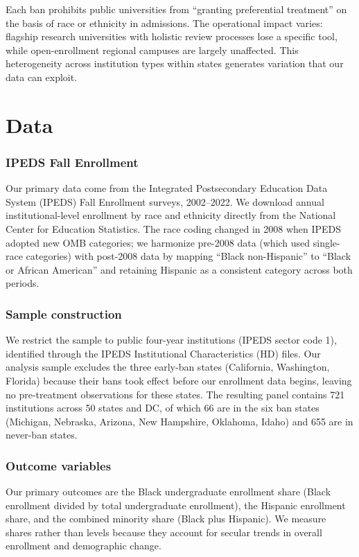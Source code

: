 \documentclass[12pt]{article}
\begin{document}
Each ban prohibits public universities from ``granting preferential treatment'' on the basis of race or ethnicity in admissions. The operational impact varies: flagship research universities with holistic review processes lose a specific tool, while open-enrollment regional campuses are largely unaffected. This heterogeneity across institution types within states generates variation that our data can exploit.


\section{Data}
\label{sec:data}

\subsubsection*{IPEDS Fall Enrollment} Our primary data come from the Integrated Postsecondary Education Data System (IPEDS) Fall Enrollment surveys, 2002--2022. We download annual institutional-level enrollment by race and ethnicity directly from the National Center for Education Statistics. The race coding changed in 2008 when IPEDS adopted new OMB categories; we harmonize pre-2008 data (which used single-race categories) with post-2008 data by mapping ``Black non-Hispanic'' to ``Black or African American'' and retaining Hispanic as a consistent category across both periods.

\subsubsection*{Sample construction} We restrict the sample to public four-year institutions (IPEDS sector code 1), identified through the IPEDS Institutional Characteristics (HD) files. Our analysis sample excludes the three early-ban states (California, Washington, Florida) because their bans took effect before our enrollment data begins, leaving no pre-treatment observations for these states. The resulting panel contains 721 institutions across 50 states and DC, of which 66 are in the six ban states (Michigan, Nebraska, Arizona, New Hampshire, Oklahoma, Idaho) and 655 are in never-ban states.

\subsubsection*{Outcome variables} Our primary outcomes are the Black undergraduate enrollment share (Black enrollment divided by total undergraduate enrollment), the Hispanic enrollment share, and the combined minority share (Black plus Hispanic). We measure shares rather than levels because they account for secular trends in overall enrollment and demographic change.
\end{document}
